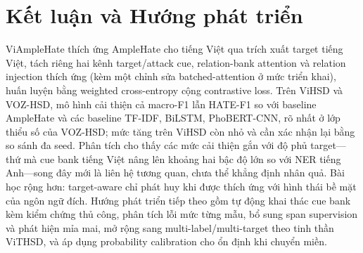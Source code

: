 \documentclass[11pt]{article}
\begin{document}
\section{Kết luận và Hướng phát triển}
ViAmpleHate thích ứng AmpleHate cho tiếng Việt qua trích xuất target tiếng Việt, tách riêng hai kênh target/attack cue, relation-bank attention và relation injection thích ứng (kèm một chỉnh sửa batched-attention ở mức triển khai), huấn luyện bằng weighted cross-entropy cộng contrastive loss. Trên ViHSD và VOZ-HSD, mô hình cải thiện cả macro-F1 lẫn HATE-F1 so với baseline AmpleHate và các baseline TF-IDF, BiLSTM, PhoBERT-CNN, rõ nhất ở lớp thiểu số của VOZ-HSD; mức tăng trên ViHSD còn nhỏ và cần xác nhận lại bằng so sánh đa seed. Phân tích cho thấy các mức cải thiện gắn với độ phủ target---thứ mà cue bank tiếng Việt nâng lên khoảng hai bậc độ lớn so với NER tiếng Anh---song đây mới là liên hệ tương quan, chưa thể khẳng định nhân quả. Bài học rộng hơn: target-aware chỉ phát huy khi được thích ứng với hình thái bề mặt của ngôn ngữ đích. Hướng phát triển tiếp theo gồm tự động khai thác cue bank kèm kiểm chứng thủ công, phân tích lỗi mức từng mẫu, bổ sung span supervision và phát hiện mỉa mai, mở rộng sang multi-label/multi-target theo tinh thần ViTHSD, và áp dụng probability calibration cho ổn định khi chuyển miền.




\appendix
\end{document}
